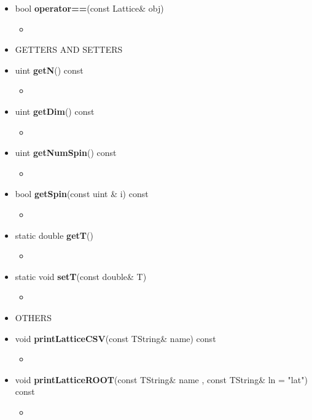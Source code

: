 \documentclass[11pt,a4paper]{article}
\begin{document}
\begin{itemize}
\begin{itemize}
			\item[] bool \textbf{operator==}(const Lattice\& obj) 		 
			\begin{itemize}
				\item[] 
			\end{itemize}

		\item[] GETTERS AND SETTERS \\
					
			\item[] uint \textbf{getN}() const 		 
			\begin{itemize}
				\item[] 
			\end{itemize}
			
			\item[] uint \textbf{getDim}() const		 
			\begin{itemize}
				\item[] 
			\end{itemize}
			
			\item[] uint \textbf{getNumSpin}() const		 
			\begin{itemize}
				\item[] 
			\end{itemize}
			
			\item[] bool \textbf{getSpin}(const uint \& i) const 		 
			\begin{itemize}
				\item[] 
			\end{itemize}
			
			\item[] static double \textbf{getT}()		 
			\begin{itemize}
				\item[] 
			\end{itemize}
			
			\item[] static void \textbf{setT}(const double\& \textunderscore T)		 
			\begin{itemize}
				\item[] 
			\end{itemize}
			
		\item[] OTHERS \\
			
			\item[] void \textbf{printLatticeCSV}(const TString\& name) const		 
			\begin{itemize}
				\item[] 
			\end{itemize}
			
			\item[] void \textbf{printLatticeROOT}(const TString\& name , const TString\& ln = "lat") const	
			\begin{itemize}
				\item[] 
			\end{itemize}
			
	\end{itemize}

	
\end{itemize}
\end{document}
